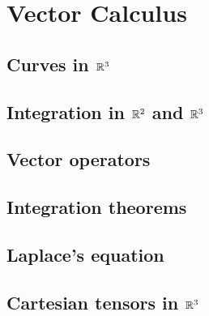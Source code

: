 \documentclass[main.tex]{subfiles}
\begin{document}
	\chapter{Vector Calculus}
		\section{Curves in $\mathbb R^3$}
		
		\section{Integration in $\mathbb R^2$ and $\mathbb R^3$}
		
		\section{Vector operators}
		
		\section{Integration theorems}
		
		\section{Laplace's equation}
		
		\section{Cartesian tensors in $\mathbb R^3$}
\end{document}
